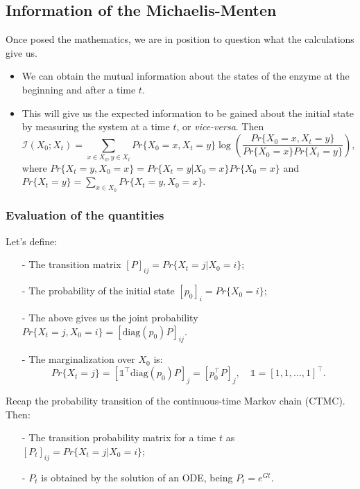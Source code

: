 \documentclass[11pt]{amsart}
\begin{document}
\subsection{Information of the Michaelis-Menten}
Once posed the mathematics, we are in position to question what the calculations give us.
\begin{itemize}
\item We can obtain the mutual information about the states of the enzyme at the beginning and after a time $t$.
\item This will give us the expected information to be gained about the initial state by measuring the system at a time $t$, or {\it vice-versa}. Then
$$\mathcal{I}(X_0;X_t) = \sum_{x \in X_0, y \in X_t} Pr\{X_0=x, X_t=y\} \log \left( \frac{Pr\{X_0\!=\!x, X_t\!=\!y\}}{Pr\{X_0\!=\!x\}Pr\{X_t\!=\!y\}} \right),$$
where $Pr\{X_t\! =\!y , X_0\! = \!x\} = Pr\{X_t\! =\!y | X_0\!=\!x\}Pr\{X_0\!=\!x\}$ and $Pr\{X_t\! =\!y\} = \sum_{x \in X_0} Pr\{X_t\!=\!y , X_0=x\} $.
\end{itemize}

\subsubsection{Evaluation of the quantities}
Let's define:

\begin{itemize}
\item[-] The transition matrix $\left[P\right]_{ij} = Pr\{X_t\! =\!j | X_0\! = \!i\}$;
\item[-] The probability of the initial state $\left[p_0\right]_i =  Pr\{ X_0\! = \!i\}$;
\item[-] The above gives us the joint probability $Pr\{X_t\! =\!j , X_0\! = \!i\}=\left[\text{diag}(p_0)P\right]_{ij}$.
\item[-] The marginalization over $X_0$ is:
$$ Pr\{X_t = j\} = \left[\mathbb{1}^\top \text{diag}(p_0)P\right]_j = \left[p_0^\top P\right]_j, \quad \mathbb{1} = [1, 1, ..., 1]^\top.$$
\end{itemize}

Recap the probability transition of the continuous-time Markov chain (CTMC). Then:
\begin{itemize}
\item[-] The transition probability matrix for a time $t$ as $\left[P_t\right]_{ij} = Pr\{X_t\! =\!j | X_0\! = \!i\}$;
\item[-] $P_t$ is obtained by the solution of an ODE, being $P_t = e^{Gt}$.
\end{itemize}
\end{document}
